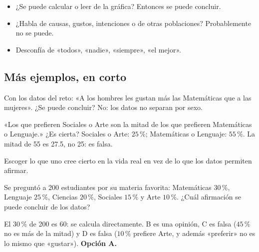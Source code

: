 \begin{regla}
\begin{itemize}
  \item ¿Se puede calcular o leer de la gráfica? Entonces se puede concluir.
  \item ¿Habla de causas, gustos, intenciones o de otras poblaciones? Probablemente no se puede.
  \item Desconfía de «todos», «nadie», «siempre», «el mejor».
\end{itemize}
\end{regla}

\subsection{Más ejemplos, en corto}
\begin{ejemplo}
Con los datos del reto: «A los hombres les gustan más las Matemáticas que a las mujeres». ¿Se puede concluir?
\solucion No: los datos no separan por sexo.
\end{ejemplo}

\begin{ejemplo}
«Los que prefieren Sociales o Arte son la mitad de los que prefieren Matemáticas o Lenguaje.» ¿Es cierta?
\solucion Sociales o Arte: $25\,\%$; Matemáticas o Lenguaje: $55\,\%$. La mitad de 55 es 27.5, no 25: es falsa.
\end{ejemplo}

\begin{trampa}
Escoger lo que uno cree cierto en la vida real en vez de lo que los datos permiten afirmar.
\end{trampa}

\begin{reto}
Se preguntó a 200 estudiantes por su materia favorita: Matemáticas $30\,\%$, Lenguaje $25\,\%$, Ciencias $20\,\%$,
Sociales $15\,\%$ y Arte $10\,\%$. ¿Cuál afirmación se puede concluir de los datos?
\end{reto}

\begin{retoresuelto}
El $30\,\%$ de 200 es 60: se calcula directamente. B es una opinión, C es falsa ($45\,\%$ no es más de la mitad) y D es
falsa ($10\,\%$ prefiere Arte, y además «preferir» no es lo mismo que «gustar»). \textbf{Opción A.}
\end{retoresuelto}

